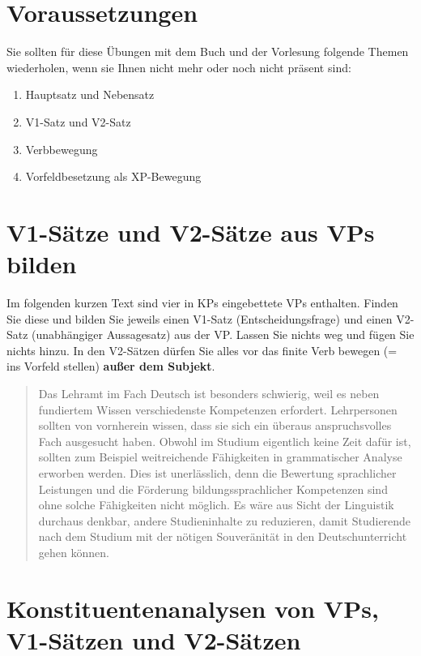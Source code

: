 \section*{Voraussetzungen}

Sie sollten für diese Übungen mit dem Buch und der Vorlesung folgende Themen wiederholen, wenn sie Ihnen nicht mehr oder noch nicht präsent sind:

\begin{enumerate}\Lf
  \item Hauptsatz und Nebensatz
  \item V1-Satz und V2-Satz
  \item Verbbewegung
  \item Vorfeldbesetzung als XP-Bewegung
\end{enumerate}

\Zeile

\section{V1-Sätze und V2-Sätze aus VPs bilden}\label{sec:bilden}

Im folgenden kurzen Text sind vier in KPs eingebettete VPs enthalten.
Finden Sie diese und bilden Sie jeweils einen V1-Satz (Entscheidungsfrage) und einen V2-Satz (unabhängiger Aussagesatz) aus der VP.
Lassen Sie nichts weg und fügen Sie nichts hinzu.
In den V2-Sätzen dürfen Sie alles vor das finite Verb bewegen (= ins Vorfeld stellen) \textbf{außer dem Subjekt}.

\begin{quote}
  Das Lehramt im Fach Deutsch ist besonders schwierig, weil es neben fundiertem Wissen verschiedenste Kompetenzen erfordert.
  Lehrpersonen sollten von vornherein wissen, dass sie sich ein überaus anspruchsvolles Fach ausgesucht haben.
  Obwohl im Studium eigentlich keine Zeit dafür ist, sollten zum Beispiel weitreichende Fähigkeiten in grammatischer Analyse erworben werden.
  Dies ist unerlässlich, denn die Bewertung sprachlicher Leistungen und die Förderung bildungssprachlicher Kompetenzen sind ohne solche Fähigkeiten nicht möglich.
  Es wäre aus Sicht der Linguistik durchaus denkbar, andere Studieninhalte zu reduzieren, damit Studierende nach dem Studium mit der nötigen Souveränität in den Deutschunterricht gehen können.
\end{quote}

\Zeile

\section{Konstituentenanalysen von VPs, V1-Sätzen und V2-Sätzen}\label{sec:analysieren}

